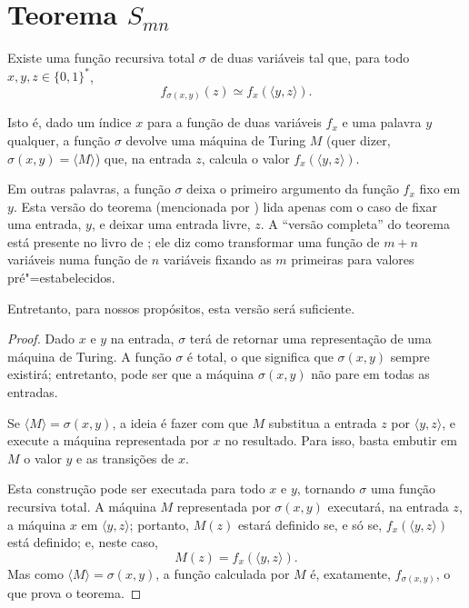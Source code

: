 \section{Teorema $S_{mn}$}
\label{sec:s_m_n_theorem}

\begin{theorem}
    Existe uma função recursiva total $\sigma$ de duas variáveis tal que,
    para todo $x, y, z \in \{0, 1\}^*$,
    \begin{equation*}
        f_{\sigma(x, y)}(z) \simeq f_x(\langle y, z \rangle).
    \end{equation*}
\end{theorem}

Isto é,
dado um índice $x$ para a função de duas variáveis $f_x$
e uma palavra $y$ qualquer,
a função $\sigma$ devolve uma máquina de Turing $M$
(quer dizer, $\sigma(x, y) = \langle M \rangle$)
que, na entrada $z$,
calcula o valor $f_x(\langle y, z \rangle)$.

Em outras palavras,
a função $\sigma$ deixa o primeiro argumento da função $f_x$
fixo em $y$.
Esta versão do teorema
(mencionada por )
lida apenas com o caso de fixar uma entrada, $y$,
e deixar uma entrada livre, $z$.
A ``versão completa'' do teorema
está presente no livro de ;
ele diz como transformar uma função de $m + n$ variáveis
numa função de $n$ variáveis
fixando as $m$ primeiras para valores pré"=estabelecidos.

Entretanto, para nossos propósitos,
esta versão será suficiente.

\begin{proof}
    Dado $x$ e $y$ na entrada,
    $\sigma$ terá de retornar uma representação de uma máquina de Turing.
    A função $\sigma$ é total,
    o que significa que $\sigma(x, y)$ sempre existirá;
    entretanto,
    pode ser que a máquina $\sigma(x, y)$ não pare em todas as entradas.

    Se $\langle M \rangle = \sigma(x, y)$,
    a ideia é fazer com que $M$ substitua a entrada $z$ por $\langle y, z \rangle$,
    e execute a máquina representada por $x$ no resultado.
    Para isso,
    basta embutir em $M$ o valor $y$ e as transições de $x$.

    Esta construção pode ser executada para todo $x$ e $y$,
    tornando $\sigma$ uma função recursiva total.
    A máquina $M$ representada por $\sigma(x, y)$ executará,
    na entrada $z$, a máquina $x$ em $\langle y, z \rangle$;
    portanto,
    $M(z)$ estará definido se, e só se, $f_x(\langle y, z \rangle)$ está definido;
    e, neste caso,
    \begin{equation*}
        M(z) = f_x( \langle y, z \rangle ).
    \end{equation*}
    Mas como $\langle M \rangle = \sigma(x, y)$,
    a função calculada por $M$ é, exatamente, $f_{\sigma(x, y)}$,
    o que prova o teorema.
\end{proof}
